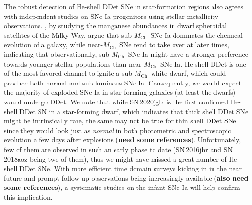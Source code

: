 \documentclass[twocolumn]{aastex631}
\newcommand{\sn}{SN\,2020jgb}
\newcommand{\Mch}{$M_\mathrm{Ch}$}
\begin{document}
The robust detection of He-shell DDet SNe in star-formation regions also agrees with independent studies on SNe Ia progenitors using stellar metallicity observations. \citet{de_los_reyes_manganese_2020}, by studying the manganese abundances in dwarf spheroidal satellites of the Milky Way, argue that sub-\Mch\ SNe Ia dominates the chemical evolution of a galaxy, while near-\Mch\ SNe tend to take over at later times, indicating that observationally, sub-\Mch\ SNe Ia might have a stronger preference towards younger stellar populations than near-\Mch\ SNe Ia. He-shell DDet is one of the most favored channel to ignite a sub-\Mch\ white dwarf, which could produce both normal and sub-luminous SNe Ia. Consequently, we would expect the majority of exploded SNe Ia in star-forming galaxies (at least the dwarfs) would undergo DDet. We note that while \sn\ is the first confirmed He-shell DDet SN in a star-forming dwarf, which indicates that thick shell DDet SNe might be intrinsically rare, the same may not be true for thin shell DDet SNe since they would look just as {\it normal} in both photometric and spectroscopic evolution a few days after explosions (\textbf{need some references}). Unfortunately, few of them are observed in such an early phase to date (SN\,2016jhr and SN\,2018aoz being two of them), thus we might have missed a great number of He-shell DDet SNe. With more efficient time domain surveys kicking in in the near future and prompt follow-up observations being increasingly available (\textbf{also need some references}), a systematic studies on the infant SNe Ia will help confirm this implication.
\end{document}
